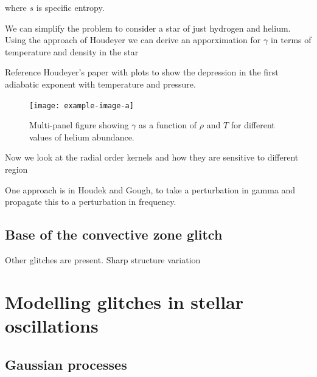 where \(s\) is specific entropy.

We can simplify the problem to consider a star of just hydrogen and helium. Using the approach of Houdeyer we can derive an apporximation for \(\gamma\) in terms of temperature and density in the star

Reference Houdeyer's paper with plots to show the depression in the first adiabatic exponent with temperature and pressure. 

\begin{figure}
    \centering
    \texttt{[image: example-image-a]}
    \caption{Multi-panel figure showing \(\gamma\) as a function of \(\rho\) and \(T\) for different values of helium abundance.}
    \label{fig:gamma-temp-density}
\end{figure}

Now we look at the radial order kernels and how they are sensitive to different region


One approach is in Houdek and Gough, to take a perturbation in gamma and propagate this to a perturbation in frequency.

\subsection{Base of the convective zone glitch}\label{sec:bcz-glitch}

Other glitches are present. Sharp structure variation

\section{Modelling glitches in stellar oscillations}


\subsection{Gaussian processes }\label{sec:glitch-gp}

